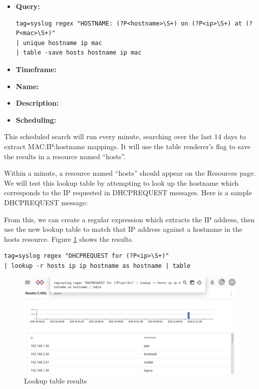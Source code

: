 \begin{itemize}
\item
  \textbf{Query:} 
\begin{Verbatim}[breaklines=true]
tag=syslog regex "HOSTNAME: (?P<hostname>\S+) on (?P<ip>\S+) at (?P<mac>\S+)" 
| unique hostname ip mac 
| table -save hosts hostname ip mac
\end{Verbatim}
\item
  \textbf{Timeframe:} 
\item
  \textbf{Name:} 
\item
  \textbf{Description:} 
\item
  \textbf{Scheduling:} \code{~* * * * *}
\end{itemize}

This scheduled search will run every minute, searching over the last 14
days to extract MAC:IP:hostname mappings. It will use the table
renderer's  flag to save the results in a resource named
``hosts''.

Within a minute, a resource named ``hosts'' should appear on the
Resources page. We will test this lookup table by attempting to look up
the hostname which corresponds to the IP requested in DHCPREQUEST
messages. Here is a sample DHCPREQUEST message:


From this, we can create a regular expression which extracts the IP
address, then use the new lookup table to match that IP address against
a hostname in the hosts resource. Figure \ref{fig:lookup-results} shows the
results.

\begin{Verbatim}[breaklines=true]
tag=syslog regex "DHCPREQUEST for (?P<ip>\S+)" 
| lookup -r hosts ip ip hostname as hostname | table
\end{Verbatim}

\begin{figure}
	\includegraphics{images/lookup-results.png}
	\caption{Lookup table results}
	\label{fig:lookup-results}
\end{figure}

